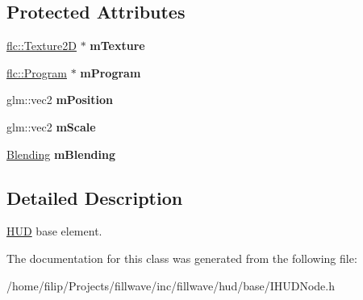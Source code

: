 \subsection*{Protected Attributes}
\begin{DoxyCompactItemize}
\item 
\hyperlink{classflw_1_1flc_1_1Texture2D}{flc\+::\+Texture2D} $\ast$ {\bfseries m\+Texture}\hypertarget{classflw_1_1flf_1_1IHUDNode_a71013ee08b9240d9d3c700820d9743f0}{}\label{classflw_1_1flf_1_1IHUDNode_a71013ee08b9240d9d3c700820d9743f0}

\item 
\hyperlink{classflw_1_1flc_1_1Program}{flc\+::\+Program} $\ast$ {\bfseries m\+Program}\hypertarget{classflw_1_1flf_1_1IHUDNode_a8a3d6ecd8d1b9d6d6b1843200e0d057e}{}\label{classflw_1_1flf_1_1IHUDNode_a8a3d6ecd8d1b9d6d6b1843200e0d057e}

\item 
glm\+::vec2 {\bfseries m\+Position}\hypertarget{classflw_1_1flf_1_1IHUDNode_aeea67115ea75ee618461914d139abdc5}{}\label{classflw_1_1flf_1_1IHUDNode_aeea67115ea75ee618461914d139abdc5}

\item 
glm\+::vec2 {\bfseries m\+Scale}\hypertarget{classflw_1_1flf_1_1IHUDNode_acbc889fbe0b0a77656c4764ee9e69458}{}\label{classflw_1_1flf_1_1IHUDNode_acbc889fbe0b0a77656c4764ee9e69458}

\item 
\hyperlink{structflw_1_1flf_1_1Blending}{Blending} {\bfseries m\+Blending}\hypertarget{classflw_1_1flf_1_1IHUDNode_a1ac47dfe7a7347beba350789870d4549}{}\label{classflw_1_1flf_1_1IHUDNode_a1ac47dfe7a7347beba350789870d4549}

\end{DoxyCompactItemize}


\subsection{Detailed Description}
\hyperlink{classflw_1_1flf_1_1HUD}{H\+UD} base element. 

The documentation for this class was generated from the following file\+:\begin{DoxyCompactItemize}
\item 
/home/filip/\+Projects/fillwave/inc/fillwave/hud/base/I\+H\+U\+D\+Node.\+h\end{DoxyCompactItemize}
